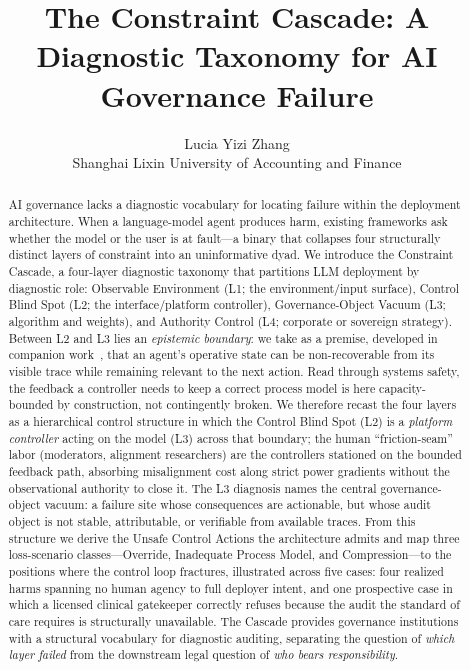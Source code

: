 \documentclass[11pt]{article}
\title{The Constraint Cascade: A Diagnostic Taxonomy for AI Governance Failure}
\author{Lucia Yizi Zhang\\Shanghai Lixin University of Accounting and Finance}
\date{}
\begin{document}
\maketitle

\begin{abstract}
AI governance lacks a diagnostic vocabulary for locating failure within the deployment architecture. When a language-model agent produces harm, existing frameworks ask whether the model or the user is at fault---a binary that collapses four structurally distinct layers of constraint into an uninformative dyad. We introduce the Constraint Cascade, a four-layer diagnostic taxonomy that partitions LLM deployment by diagnostic role: Observable Environment (L1; the environment/input surface), Control Blind Spot (L2; the interface/platform controller), Governance-Object Vacuum (L3; algorithm and weights), and Authority Control (L4; corporate or sovereign strategy). Between L2 and L3 lies an \emph{epistemic boundary}: we take as a premise, developed in companion work~\cite{anon2026dual}, that an agent's operative state can be non-recoverable from its visible trace while remaining relevant to the next action. Read through systems safety, the feedback a controller needs to keep a correct process model is here capacity-bounded by construction, not contingently broken. We therefore recast the four layers as a hierarchical control structure in which the Control Blind Spot (L2) is a \emph{platform controller} acting on the model (L3) across that boundary; the human ``friction-seam'' labor (moderators, alignment researchers) are the controllers stationed on the bounded feedback path, absorbing misalignment cost along strict power gradients without the observational authority to close it. The L3 diagnosis names the central governance-object vacuum: a failure site whose consequences are actionable, but whose audit object is not stable, attributable, or verifiable from available traces. From this structure we derive the Unsafe Control Actions the architecture admits and map three loss-scenario classes---Override, Inadequate Process Model, and Compression---to the positions where the control loop fractures, illustrated across five cases: four realized harms spanning no human agency to full deployer intent, and one prospective case in which a licensed clinical gatekeeper correctly refuses because the audit the standard of care requires is structurally unavailable. The Cascade provides governance institutions with a structural vocabulary for diagnostic auditing, separating the question of \textit{which layer failed} from the downstream legal question of \textit{who bears responsibility}.
\end{abstract}














\end{document}
